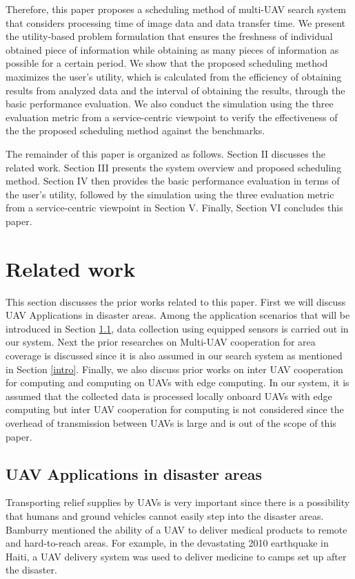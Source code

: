 \documentclass{ieeeaccess}
\begin{document}
Therefore, this paper proposes a scheduling method of multi-UAV search system that considers processing time of image data and data transfer time.
We present the utility-based problem formulation that ensures the freshness of individual obtained piece of information while obtaining as many pieces of information as possible for a certain period.
We show that the proposed scheduling method maximizes the user's utility, which is calculated from the efficiency of obtaining results from analyzed data and the interval of obtaining the results, through the basic performance evaluation.
We also conduct the simulation using the three evaluation metric from a service-centric viewpoint to verify the effectiveness of the the proposed scheduling method against the benchmarks.

The remainder of this paper is organized as follows. Section II discusses the related work. Section III presents the system overview and proposed scheduling method. Section IV then provides the basic performance evaluation in terms of the user's utility, followed by the simulation using the three evaluation metric from a service-centric viewpoint in Section V. Finally, Section VI concludes this paper.
%
%
\section{Related work}
This section discusses the prior works related to this paper.
First we will discuss UAV Applications in disaster areas. 
Among the application scenarios that will be introduced in Section \ref{app}, data collection using equipped sensors is carried out in our system.
Next the prior researches on Multi-UAV cooperation for area coverage is discussed since it is also assumed in our search system as mentioned in Section \ref{intro}.
Finally, we also discuss prior works on inter UAV cooperation for computing and  computing on UAVs with edge computing.
In our system, it is assumed that the collected data is processed locally onboard UAVs with edge computing but inter UAV cooperation for computing is not considered since the overhead of transmission between UAVs is large and is out of the scope of this paper.

\subsection{UAV Applications in disaster areas}\label{app}
Transporting relief supplies by UAVs is very important since there is a possibility that humans and ground vehicles cannot easily step into the disaster areas.
Bamburry mentioned the ability of a UAV to deliver medical products to remote and hard-to-reach areas\cite{Bamburry2015}.
For example, in the devastating 2010 earthquake in Haiti, a UAV delivery system was used to deliver medicine to camps set up after the disaster\cite{May2015}.
\end{document}
